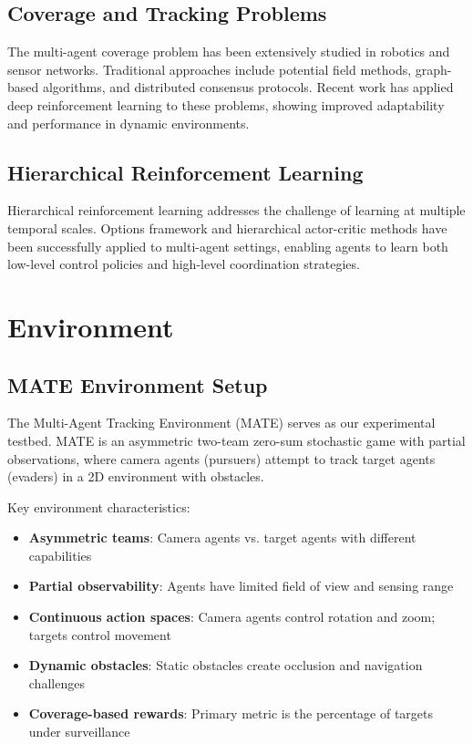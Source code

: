 \documentclass[conference]{IEEEtran}
\begin{document}
\subsection{Coverage and Tracking Problems}
The multi-agent coverage problem has been extensively studied in robotics and sensor networks. Traditional approaches include potential field methods, graph-based algorithms, and distributed consensus protocols. Recent work has applied deep reinforcement learning to these problems, showing improved adaptability and performance in dynamic environments.

\subsection{Hierarchical Reinforcement Learning}
Hierarchical reinforcement learning addresses the challenge of learning at multiple temporal scales. Options framework and hierarchical actor-critic methods have been successfully applied to multi-agent settings, enabling agents to learn both low-level control policies and high-level coordination strategies.

\section{Environment}

\subsection{MATE Environment Setup}
The Multi-Agent Tracking Environment (MATE) serves as our experimental testbed. MATE is an asymmetric two-team zero-sum stochastic game with partial observations, where camera agents (pursuers) attempt to track target agents (evaders) in a 2D environment with obstacles.

Key environment characteristics:
\begin{itemize}
\item \textbf{Asymmetric teams}: Camera agents vs. target agents with different capabilities
\item \textbf{Partial observability}: Agents have limited field of view and sensing range
\item \textbf{Continuous action spaces}: Camera agents control rotation and zoom; targets control movement
\item \textbf{Dynamic obstacles}: Static obstacles create occlusion and navigation challenges
\item \textbf{Coverage-based rewards}: Primary metric is the percentage of targets under surveillance
\end{itemize}
\end{document}
